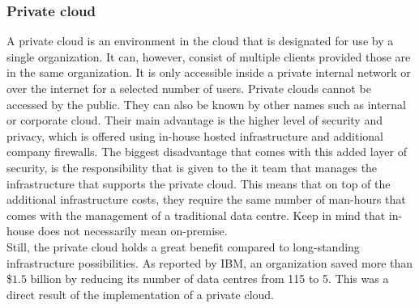 \subsubsection{Private cloud}
A private cloud is an environment in the cloud that is designated for use by a single organization. 
It can, however, consist of multiple clients provided those are in the same organization. 
It is only accessible inside a private internal network or over the internet for a selected number of users. 
Private clouds cannot be accessed by the public. 
They can also be known by other names such as internal or corporate cloud. 
Their main advantage is the higher level of security and privacy, which is offered using in-house hosted infrastructure and additional company firewalls. 
The biggest disadvantage that comes with this added layer of security, is the responsibility that is given to the \acrshort{it} team that manages the infrastructure that supports the private cloud. 
This means that on top of the additional infrastructure costs, they require the same number of man-hours that comes with the management of a traditional data centre. 
Keep in mind that in-house does not necessarily mean on-premise.
\\
Still, the private cloud holds a great benefit compared to long-standing infrastructure possibilities. 
As reported by IBM, an organization saved more than \${$1.5$} billion by reducing its number of data centres from 115 to 5. 
This was a direct result of the implementation of a private cloud. \autocite{Hofmann2010} 


